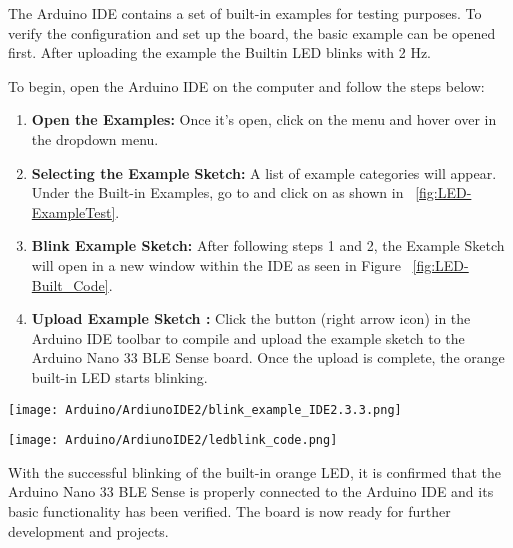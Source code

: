 The Arduino IDE contains a set of built-in examples for testing purposes. To verify the configuration and set up the board, the basic example  can be opened first. After uploading the example  the Builtin LED blinks with 2 Hz. 


To begin, open the Arduino IDE on the computer and follow the steps below:

\begin{enumerate}



\item \textbf{Open the Examples:} Once it's open, click on the  menu and hover over  in the dropdown menu. 

\item \textbf{Selecting the Example Sketch:} A list of example categories will appear. Under the Built-in Examples, go to  and click on  as shown in ~\ref{fig:LED-ExampleTest}.

\item \textbf{Blink Example Sketch:} After following steps 1 and 2, the  Example Sketch  will open in a new window within the IDE as seen in Figure ~\ref{fig:LED-Built_Code}.

\item \textbf{Upload Example Sketch :} Click the  button (right arrow icon) in the Arduino IDE toolbar to compile and upload the example sketch to the Arduino Nano 33 BLE Sense board. Once the upload is complete, the orange built-in LED starts blinking. 



\end{enumerate}


\begin{center}
	\texttt{[image: Arduino/ArdiunoIDE2/blink\_example\_IDE2.3.3.png]}
	\label{fig:LED-ExampleTest}		
\end{center} 



\begin{center}
	\texttt{[image: Arduino/ArdiunoIDE2/ledblink\_code.png]}
	\label{fig:LED-Built_Code}		
\end{center} 



With the successful blinking of the built-in orange LED, it is confirmed that the Arduino Nano 33 BLE Sense is properly connected to the Arduino IDE and its basic functionality has been verified. The board is now ready for further development and projects.






